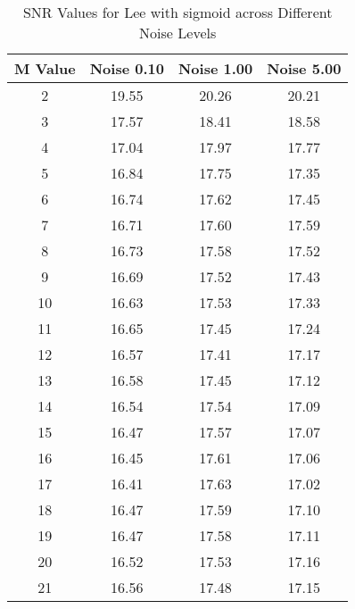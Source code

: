 \begin{table}[htb]
\small
\centering
\begin{tabular}{|c|c|c|c|} \hline
M Value & Noise 0.10 & Noise 1.00 & Noise 5.00 \\ \hline
2 & 19.55 & 20.26 & 20.21 \\ \hline
3 & 17.57 & 18.41 & 18.58 \\ \hline
4 & 17.04 & 17.97 & 17.77 \\ \hline
5 & 16.84 & 17.75 & 17.35 \\ \hline
6 & 16.74 & 17.62 & 17.45 \\ \hline
7 & 16.71 & 17.60 & 17.59 \\ \hline
8 & 16.73 & 17.58 & 17.52 \\ \hline
9 & 16.69 & 17.52 & 17.43 \\ \hline
10 & 16.63 & 17.53 & 17.33 \\ \hline
11 & 16.65 & 17.45 & 17.24 \\ \hline
12 & 16.57 & 17.41 & 17.17 \\ \hline
13 & 16.58 & 17.45 & 17.12 \\ \hline
14 & 16.54 & 17.54 & 17.09 \\ \hline
15 & 16.47 & 17.57 & 17.07 \\ \hline
16 & 16.45 & 17.61 & 17.06 \\ \hline
17 & 16.41 & 17.63 & 17.02 \\ \hline
18 & 16.47 & 17.59 & 17.10 \\ \hline
19 & 16.47 & 17.58 & 17.11 \\ \hline
20 & 16.52 & 17.53 & 17.16 \\ \hline
21 & 16.56 & 17.48 & 17.15 \\ \hline
\end{tabular}
\caption{SNR Values for Lee with sigmoid across Different Noise Levels}
\end{table}

